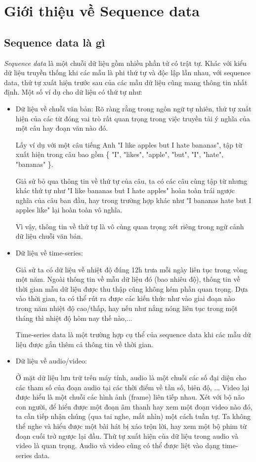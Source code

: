 \section{Giới thiệu về Sequence data}
\subsection{Sequence data là gì}
\hspace{\parindent} \textit{Sequence data} là một chuỗi dữ liệu gồm nhiều phần tử có trật tự. Khác với kiểu dữ liệu truyền thống khi các mẫu là phi thứ tự và độc lập lẫn nhau, với sequence data, thứ tự xuất hiện trước sau của các mẫu dữ liệu cũng mang thông tin nhất định. Một số ví dụ cho dữ liệu có thứ tự như:
\begin{itemize}
    \item Dữ liệu về chuỗi văn bản: Rõ ràng rằng trong ngôn ngữ tự nhiên, thứ tự xuất hiện của các từ đóng vai trò rất quan trọng trong việc truyền tải ý nghĩa của một câu hay đoạn văn nào đó.

    Lấy ví dụ với một câu tiếng Anh  "I like apples but I hate bananas", tập từ xuất hiện trong câu bao gồm \{ "I", "likes", "apple", "but", "I", "hate", "bananas" \}.

    Giả sử bỏ qua thông tin về thứ tự của câu, ta có các câu cùng tập từ nhưng khác thứ tự như "I like bananas but I hate apples" hoàn toàn trái ngược nghĩa của câu ban đầu, hay trong trường hợp khác như "I bananas hate but I apples like" lại hoàn toàn vô nghĩa.

    Vì vậy, thông tin về thứ tự là vô cùng quan trọng xét riêng trong ngữ cảnh dữ liệu chuỗi văn bản.
    \item Dữ liệu về time-series:

    Giả sử ta có dữ liệu về nhiệt độ đúng 12h trưa mỗi ngày liên tục trong vòng một năm. Ngoài thông tin về mẫu dữ liệu đó (bao nhiêu độ), thông tin về thời gian mẫu dữ liệu được thu thập cũng không kém phần quan trọng. Dựa vào thời gian, ta có thể rút ra được các kiến thức như vào giai đoạn nào trong năm nhiệt độ cao/thấp, hay nếu như nắng nóng liên tục trong một tháng thì nhiệt độ hôm nay thế nào,...

    Time-series data là một trường hợp cụ thể của sequence data khi các mẫu dữ liệu được gắn thêm cả thông tin về thời gian.
    \item Dữ liệu về audio/video:

    Ở mặt dữ liệu lưu trữ trên máy tính, audio là một chuỗi các số đại diện cho các tham số của đoạn audio tại các thời điểm về tần số, biên độ, ... Video lại được hiểu là một chuỗi các hình ảnh (frame) liên tiếp nhau. Xét với bộ não con người, để hiểu được một đoạn âm thanh hay xem một đoạn video nào đó, ta cần tiếp nhận chúng (qua tai nghe, mắt nhìn) một cách tuần tự. Ta không thể nghe và hiểu được một bài hát bị xáo trộn lời, hay xem một bộ phim từ đoạn cuối trở ngược lại đầu. Thứ tự xuất hiện của dữ liệu trong audio và video là quan trọng. Audio và video cũng có thể được liệt vào dạng time-series data.
\end{itemize}

